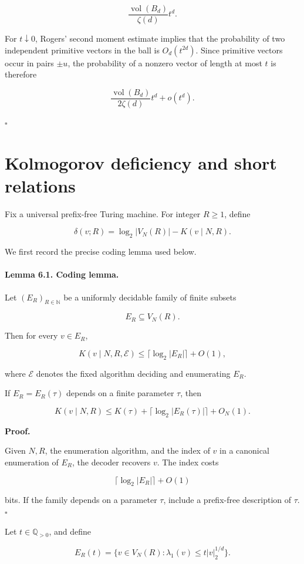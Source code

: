 \documentclass[11pt]{article}
\begin{document}
\[
\frac{\operatorname{vol}(B_d)}{\zeta(d)}t^d.
\]

For $t\downarrow0$, Rogers' second moment estimate implies that the probability of two independent primitive vectors in the ball is $O_d(t^{2d})$. Since primitive vectors occur in pairs $\pm u$, the probability of a nonzero vector of length at most $t$ is therefore

\[
\frac{\operatorname{vol}(B_d)}{2\zeta(d)}t^d+o(t^d).
\]

$\square$

\section{Kolmogorov deficiency and short relations}

Fix a universal prefix-free Turing machine. For integer $R\ge1$, define

\[
\delta(v;R)=\log_2|V_N(R)|-K(v\mid N,R).
\]

We first record the precise coding lemma used below.

\paragraph{Lemma 6.1. Coding lemma.}

Let $(E_R)_{R\in\mathbb N}$ be a uniformly decidable family of finite subsets

\[
E_R\subseteq V_N(R).
\]

Then for every $v\in E_R$,

\[
K(v\mid N,R,\mathcal E)
\le
\lceil\log_2|E_R|\rceil+O(1),
\]

where $\mathcal E$ denotes the fixed algorithm deciding and enumerating $E_R$.

If $E_R=E_R(\tau)$ depends on a finite parameter $\tau$, then

\[
K(v\mid N,R)
\le
K(\tau)+\lceil\log_2|E_R(\tau)|\rceil+O_N(1).
\]

\noindent\textbf{Proof.}

Given $N,R$, the enumeration algorithm, and the index of $v$ in a canonical enumeration of $E_R$, the decoder recovers $v$. The index costs

\[
\lceil\log_2|E_R|\rceil+O(1)
\]

bits. If the family depends on a parameter $\tau$, include a prefix-free description of $\tau$. $\square$

Let $t\in\mathbb Q_{>0}$, and define

\[
E_R(t)=
\{v\in V_N(R):\lambda_1(v)\le t|v|_2^{1/d}\}.
\]
\end{document}
